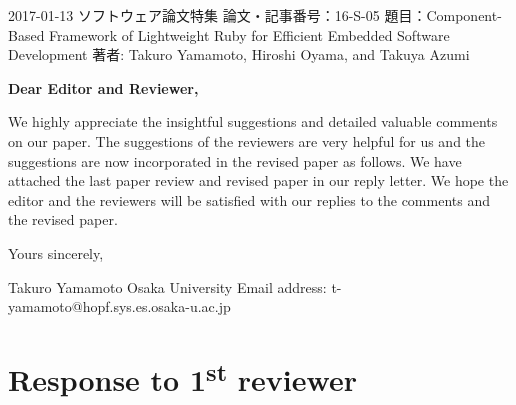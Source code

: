 \documentclass{article}
\newcommand\st{\textsuperscript{st}\xspace}
\begin{document}
\begin{flushleft}
  2017-01-13\newline 
  ソフトウェア論文特集\newline
  論文・記事番号：16-S-05\newline
  題目：Component-Based Framework of Lightweight Ruby for Efficient Embedded Software Development\newline
  著者: Takuro Yamamoto, Hiroshi Oyama, and Takuya Azumi\newline
\end{flushleft}
\textbf{Dear Editor and Reviewer,}\newline

We highly appreciate the insightful suggestions and detailed valuable comments on our paper. 
The suggestions of the reviewers are very helpful for us and the suggestions are now incorporated in the revised paper as follows.
We have attached the last paper review and revised paper in our reply letter.
We hope the editor and the reviewers will be satisfied with our replies to the comments and the revised paper.\newline\newline

\begin{flushleft}
  Yours sincerely,\newline

  Takuro Yamamoto\newline
  Osaka University\newline
  Email address: t-yamamoto@hopf.sys.es.osaka-u.ac.jp\newline
\end{flushleft}

\clearpage

\section{Response to 1\st reviewer}
\end{document}
